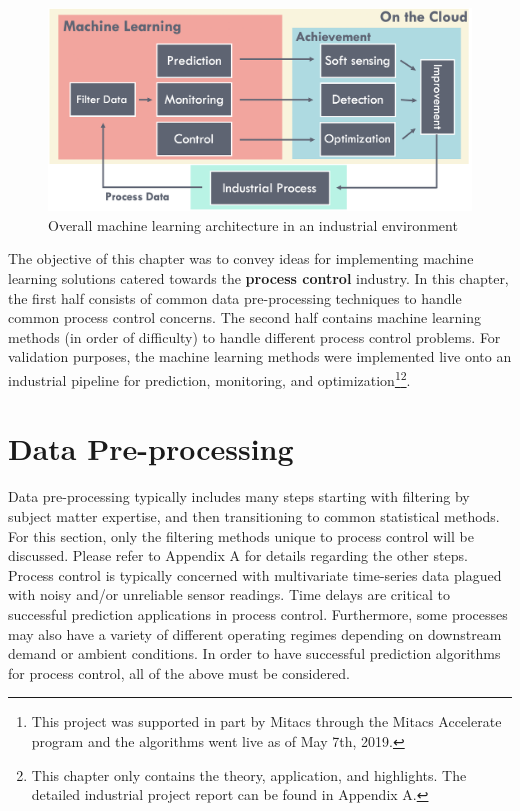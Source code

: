 \begin{figure}[h]
    \centering
    \includegraphics[width=\textwidth]{images/ch2/02AICloud.png}
    \caption{Overall machine learning architecture in an industrial environment}
    \label{fig:02AICloud}
\end{figure}

The objective of this chapter was to convey ideas for implementing machine learning solutions catered towards the \textbf{process control} industry.  In this chapter, the first half consists of common data pre-processing techniques to handle common process control concerns.  The second half contains machine learning methods (in order of difficulty) to handle different process control problems. For validation purposes, the machine learning methods were implemented live onto an industrial pipeline for prediction, monitoring, and optimization\footnote{This project was supported in part by Mitacs through the Mitacs Accelerate program and the algorithms went live as of May 7th, 2019.}\footnote{This chapter only contains the theory, application, and highlights. The detailed industrial project report can be found in Appendix A.}.

\section{Data Pre-processing}
Data pre-processing typically includes many steps starting with filtering by subject matter expertise, and then transitioning to common statistical methods.  For this section, only the filtering methods unique to process control will be discussed. Please refer to Appendix A for details regarding the other steps. Process control is typically concerned with multivariate time-series data plagued with noisy and/or unreliable sensor readings. Time delays are critical to successful prediction applications in process control. Furthermore, some processes may also have a variety of different operating regimes depending on downstream demand or ambient conditions.  In order to have successful prediction algorithms for process control, all of the above must be considered.

